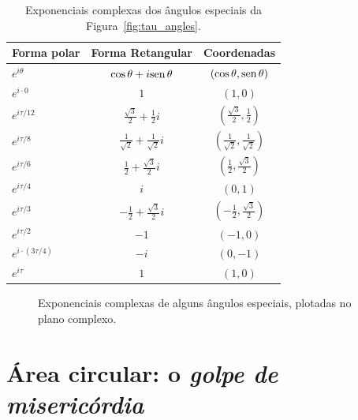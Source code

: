 \begin{table}
\begin{center}
\begin{tabular}{lcc}
Forma polar & Forma Retangular & Coordenadas \\ \hline\hline
$e^{i\theta}$ & $\cos\theta + i\mbox{sen}\,\theta$ & $(\cos\theta, \mbox{sen}\,\theta)$ \\ \hline
$e^{i\cdot0}$ & $1$ & $(1, 0)$ \smallskip \\
$e^{i\tau/12}$ & $\frac{\sqrt{3}}{2} + \frac{1}{2}i$ & $(\frac{\sqrt{3}}{2}, \frac{1}{2})$ \smallskip \\
$e^{i\tau/8}$ & $\frac{1}{\sqrt{2}} +  \frac{1}{\sqrt{2}}i$ & $(\frac{1}{\sqrt{2}}, \frac{1}{\sqrt{2}})$ \smallskip \\
$e^{i\tau/6}$ & $\frac{1}{2} +\frac{\sqrt{3}}{2} i$ & $(\frac{1}{2}, \frac{\sqrt{3}}{2})$ \smallskip \\
$e^{i\tau/4}$ & $i$ & $(0, 1)$ \smallskip \\
$e^{i\tau/3}$ & $-\frac{1}{2} +\frac{\sqrt{3}}{2} i$ & $(-\frac{1}{2}, \frac{\sqrt{3}}{2})$ \smallskip \\
$e^{i\tau/2}$ & $-1$ & $(-1, 0)$ \smallskip \\
$e^{i\cdot(3\tau/4)}$ & $-i$ & $(0, -1)$ \smallskip \\
$e^{i\tau}$ & $1$ & $(1, 0)$
\end{tabular}
\end{center}
\caption{Exponenciais complexas dos ângulos especiais da Figura~\ref{fig:tau_angles}.\label{table:complex_exponentials}}
\end{table}

\begin{figure}
\begin{center}
\end{center}
\caption{Exponenciais complexas de alguns ângulos especiais, plotadas no plano complexo.\label{fig:tau_euler_circle}}
\end{figure}


\section{Área circular: o \emph{golpe de misericórdia}} %
\label{sec:circular_area}

